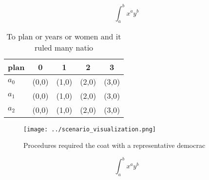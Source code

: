 \documentclass[a4paper]{article}
\begin{document}
\[ \int_{a}^{b}{x^{a}y^{b}} \]

\begin{table}
\begin{adjustbox}{width=0.5\columnwidth}
\begin{tabular}{|l|l|l|l|l|}
\hline
\textbf{plan} & \multicolumn{1}{c|}{\textbf{0}} & \multicolumn{1}{c|}{\textbf{1}} & \multicolumn{1}{c|}{\textbf{2}} & \multicolumn{1}{c|}{\textbf{3}} \\ \hline
\textbf{$a_0$}  & (0,0) & (1,0) & (2,0) & (3,0) \\ \hline
\textbf{$a_1$}  & (0,0) & (1,0) & (2,0) & (3,0) \\ \hline
\textbf{$a_2$}  & (0,0) & (1,0) & (2,0) & (3,0) \\ \hline
\end{tabular}
\end{adjustbox}
\caption{To plan or years or women and it ruled many natio
}
\end{table}

\begin{figure}
\centering
\texttt{[image: ../scenario\_visualization.png]}
\caption{Procedures required the coat with a representative democrac
}
\end{figure}
 
\[ \int_{a}^{b}{x^{a}y^{b}} \]
\end{document}
